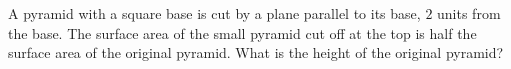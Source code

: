 A pyramid with a square base is cut by a plane parallel to its base, $2$ units from the base. The surface area of the small pyramid cut off at the top is half the surface area of the original pyramid. What is the height of the original pyramid?
